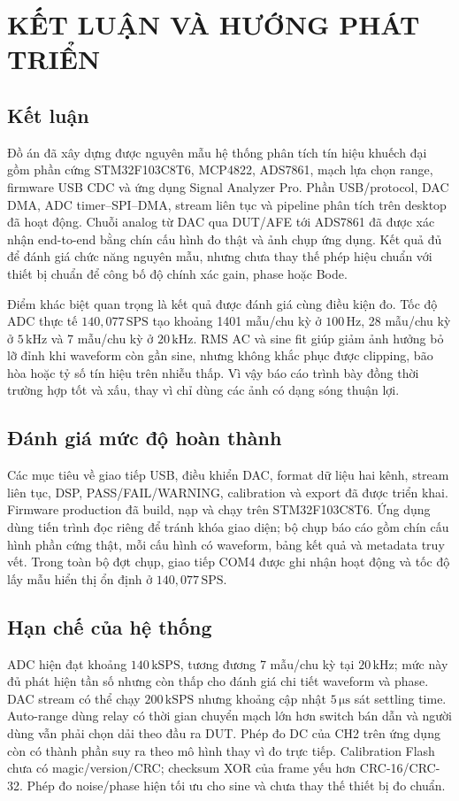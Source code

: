 \documentclass[12pt,a4paper]{report}
\newcommand{\unit}[1]{\,\mathrm{#1}}
\begin{document}
\chapter{KẾT LUẬN VÀ HƯỚNG PHÁT TRIỂN}

\section{Kết luận}
Đồ án đã xây dựng được nguyên mẫu hệ thống phân tích tín hiệu khuếch đại gồm phần cứng STM32F103C8T6, MCP4822, ADS7861, mạch lựa chọn range, firmware USB CDC và ứng dụng Signal Analyzer Pro. Phần USB/protocol, DAC DMA, ADC timer--SPI--DMA, stream liên tục và pipeline phân tích trên desktop đã hoạt động. Chuỗi analog từ DAC qua DUT/AFE tới ADS7861 đã được xác nhận end-to-end bằng chín cấu hình đo thật và ảnh chụp ứng dụng. Kết quả đủ để đánh giá chức năng nguyên mẫu, nhưng chưa thay thế phép hiệu chuẩn với thiết bị chuẩn để công bố độ chính xác gain, phase hoặc Bode.

Điểm khác biệt quan trọng là kết quả được đánh giá cùng điều kiện đo. Tốc độ ADC thực tế $140{,}077\unit{SPS}$ tạo khoảng 1401 mẫu/chu kỳ ở $100\unit{Hz}$, 28 mẫu/chu kỳ ở $5\unit{kHz}$ và 7 mẫu/chu kỳ ở $20\unit{kHz}$. RMS AC và sine fit giúp giảm ảnh hưởng bỏ lỡ đỉnh khi waveform còn gần sine, nhưng không khắc phục được clipping, bão hòa hoặc tỷ số tín hiệu trên nhiễu thấp. Vì vậy báo cáo trình bày đồng thời trường hợp tốt và xấu, thay vì chỉ dùng các ảnh có dạng sóng thuận lợi.

\section{Đánh giá mức độ hoàn thành}
Các mục tiêu về giao tiếp USB, điều khiển DAC, format dữ liệu hai kênh, stream liên tục, DSP, PASS/FAIL/WARNING, calibration và export đã được triển khai. Firmware production đã build, nạp và chạy trên STM32F103C8T6. Ứng dụng dùng tiến trình đọc riêng để tránh khóa giao diện; bộ chụp báo cáo gồm chín cấu hình phần cứng thật, mỗi cấu hình có waveform, bảng kết quả và metadata truy vết. Trong toàn bộ đợt chụp, giao tiếp COM4 được ghi nhận hoạt động và tốc độ lấy mẫu hiển thị ổn định ở $140{,}077\unit{SPS}$.

\section{Hạn chế của hệ thống}
ADC hiện đạt khoảng $140\unit{kSPS}$, tương đương 7 mẫu/chu kỳ tại $20\unit{kHz}$; mức này đủ phát hiện tần số nhưng còn thấp cho đánh giá chi tiết waveform và phase. DAC stream có thể chạy $200\unit{kSPS}$ nhưng khoảng cập nhật $5\unit{\mu s}$ sát settling time. Auto-range dùng relay có thời gian chuyển mạch lớn hơn switch bán dẫn và người dùng vẫn phải chọn dải theo đầu ra DUT. Phép đo DC của CH2 trên ứng dụng còn có thành phần suy ra theo mô hình thay vì đo trực tiếp. Calibration Flash chưa có magic/version/CRC; checksum XOR của frame yếu hơn CRC-16/CRC-32. Phép đo noise/phase hiện tối ưu cho sine và chưa thay thế thiết bị đo chuẩn.
\end{document}
